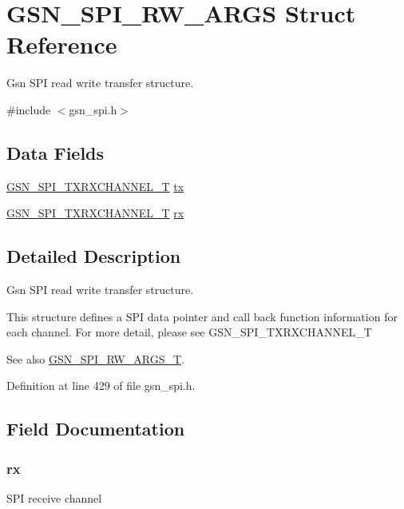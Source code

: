 \hypertarget{a00239}{
\section{GSN\_\-SPI\_\-RW\_\-ARGS Struct Reference}
\label{a00239}
}


Gsn SPI read write transfer structure.  




{\ttfamily \#include $<$gsn\_\-spi.h$>$}

\subsection*{Data Fields}
\begin{DoxyCompactItemize}
\item 
\hyperlink{a00241}{GSN\_\-SPI\_\-TXRXCHANNEL\_\-T} \hyperlink{a00239_a703033c527062b683f63ff1cd82fe5c2}{tx}
\item 
\hyperlink{a00241}{GSN\_\-SPI\_\-TXRXCHANNEL\_\-T} \hyperlink{a00239_a83247e63232c34734c41e9ff50568b1c}{rx}
\end{DoxyCompactItemize}


\subsection{Detailed Description}
Gsn SPI read write transfer structure. 

This structure defines a SPI data pointer and call back function information for each channel. For more detail, please see GSN\_\-SPI\_\-TXRXCHANNEL\_\-T

\begin{DoxySeeAlso}{See also}
\hyperlink{a00655_ga9da696c71bee0cdc5b3365d5d055e389}{GSN\_\-SPI\_\-RW\_\-ARGS\_\-T}. 
\end{DoxySeeAlso}


Definition at line 429 of file gsn\_\-spi.h.



\subsection{Field Documentation}
\hypertarget{a00239_a83247e63232c34734c41e9ff50568b1c}{
\subsubsection[{rx}]{ {\bf rx}}}
\label{a00239_a83247e63232c34734c41e9ff50568b1c}
SPI receive channel 

